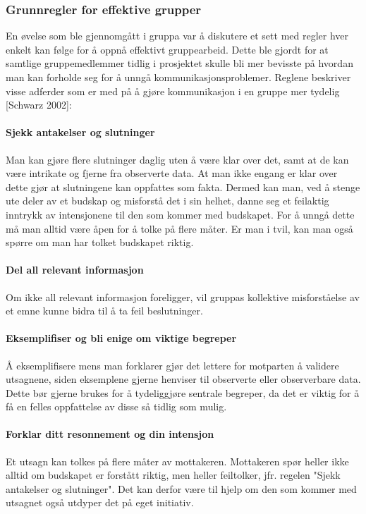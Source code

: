 \subsubsection{Grunnregler for effektive grupper}

En øvelse som ble gjennomgått i gruppa var å diskutere et sett med regler hver enkelt kan følge for å oppnå effektivt gruppearbeid.
Dette ble gjordt for at samtlige gruppemedlemmer tidlig i prosjektet skulle bli mer bevisste på hvordan man kan forholde seg for å unngå kommunikasjonsproblemer.
Reglene beskriver visse adferder som er med på å gjøre kommunikasjon i en gruppe mer tydelig [Schwarz 2002]:

\paragraph{Sjekk antakelser og slutninger}
Man kan gjøre flere slutninger daglig uten å være klar over det, samt at de kan være intrikate og fjerne fra observerte data.
At man ikke engang er klar over dette gjør at slutningene kan oppfattes som fakta.
Dermed kan man, ved å stenge ute deler av et budskap og misforstå det i sin helhet, danne seg et feilaktig inntrykk av intensjonene til den som kommer med budskapet.
For å unngå dette må man alltid være åpen for å tolke på flere måter.
Er man i tvil, kan man også spørre om man har tolket budskapet riktig.

\paragraph{Del all relevant informasjon}
Om ikke all relevant informasjon foreligger, vil gruppas kollektive misforståelse av et emne kunne bidra til å ta feil beslutninger.

\paragraph{Eksemplifiser og bli enige om viktige begreper}
Å eksemplifisere mens man forklarer gjør det lettere for motparten å validere utsagnene, siden eksemplene gjerne henviser til observerte eller observerbare data.
Dette bør gjerne brukes for å tydeliggjøre sentrale begreper, da det er viktig for å få en felles oppfattelse av disse så tidlig som mulig.

\paragraph{Forklar ditt resonnement og din intensjon}
Et utsagn kan tolkes på flere måter av mottakeren.
Mottakeren spør heller ikke alltid om budskapet er forstått riktig, men heller feiltolker, jfr. regelen "Sjekk antakelser og slutninger".
Det kan derfor være til hjelp om den som kommer med utsagnet også utdyper det på eget initiativ.

